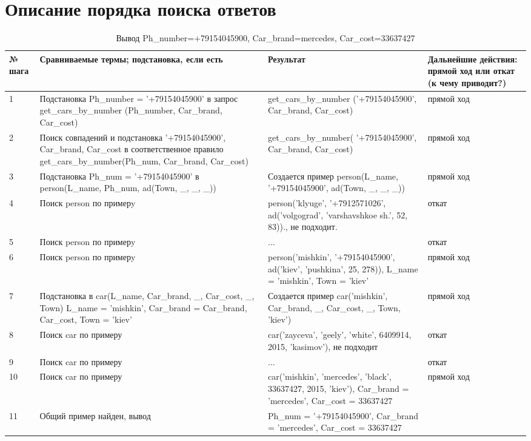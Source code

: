 \section*{Описание порядка поиска ответов}
\begin{table}
	\caption{Вывод Ph\_number=+79154045900, Car\_brand=mercedes, Car\_cost=33637427 }
\begin{tabular}{|p{1cm}|p{5cm}|p{5cm}|p{5cm}|}
	\hline
	№ шага & Сравниваемые термы; подстановка, если есть  & Результат  & Дальнейшие действия: прямой ход или откат (к чему приводит?) \\
	\hline
	1 & Подстановка Ph\_number = '+79154045900' в запрос get\_cars\_by\_number (Ph\_number, Car\_brand, Car\_cost) & get\_cars\_by\_number ('+79154045900', Car\_brand, Car\_cost) & прямой ход \\
	\hline
	2 & Поиск совпадений и подстановка '+79154045900', Car\_brand, Car\_cost в соответственное правило  get\_cars\_by\_number(Ph\_num, Car\_brand, Car\_cost) & get\_cars\_by\_number( '+79154045900', Car\_brand, Car\_cost) & прямой ход \\
	\hline
	3 & Подстановка Ph\_num = '+79154045900' в person(L\_name, Ph\_num, ad(Town, \_, \_, \_)) & Создается пример person(L\_name, '+79154045900', ad(Town, \_, \_, \_)) & прямой ход \\
	\hline
	
	4 & Поиск person по примерy & person('klyuge', '+7912571026', ad('volgograd', 'varshavshkoe sh.', 52, 83))., не подходит. & откат \\
	\hline
	5 & Поиск person по примерy & ... & откат \\
	\hline
	6 & Поиск person по примерy & person('mishkin', '+79154045900', ad('kiev', 'pushkina', 25, 278)), L\_name = 'mishkin', Town = 'kiev' & прямой ход \\
	\hline
	7 & Подстановка в car(L\_name, Car\_brand, \_, Car\_cost, \_, Town) L\_name = 'mishkin', Car\_brand = Car\_brand, Car\_cost, Town = 'kiev' & Создается пример car('mishkin', Car\_brand, \_, Car\_cost, \_, Town, 'kiev') & прямой ход \\
	\hline
	8 & Поиск car по примеру & car('zayceva', 'geely', 'white', 6409914, 2015, 'kasimov'), не подходит & откат \\
	\hline
	9 & Поиск car по примеру & ... & откат \\
	\hline
	10 & Поиск car по примеру & car('mishkin', 'mercedes', 'black', 33637427, 2015, 'kiev'), Car\_brand = 'mercedes', Car\_cost = 33637427 & прямой ход \\
	\hline
	11 & Общий пример найден, вывод & Ph\_num = '+79154045900', Car\_brand = 'mercedes', Car\_cost = 33637427 &  \\
	\hline
\end{tabular}
\end{table}

